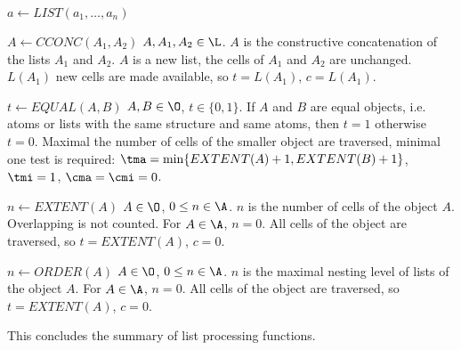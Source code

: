 \begin{deflist}{$a \gets LIST(a_1, \ldots, a_n)$}
\item[$A \gets CCONC(A_1, A_2)$] $A, A_1, A_2 \in \L$. 
     $A$ is the constructive concatenation of the 
     lists $A_1$ and $A_2$. $A$ is a new list,
     the cells of $A_1$ and $A_2$ are unchanged. 
     $L(A_1)$ new cells are made available, so 
     $t = L(A_1)$, $c = L(A_1)$.
\item[$t \gets EQUAL(A,B)$] $A, B \in \O$, $t \in \{0, 1\}$. 
     If $A$ and $B$ are equal objects, i.e. 
     atoms or lists with the same structure and same atoms, 
     then $t = 1$ otherwise $t = 0$.
     Maximal the number of cells of the smaller
     object are traversed, minimal one test is required: 
     $\tma = \min\{ EXTENT(A) + 1, EXTENT(B) + 1 \}$, 
     $\tmi = 1$, $\cma = \cmi = 0$.
\item[$n \gets EXTENT(A)$] $A \in \O$, $0 \leq n \in \A$. 
     $n$ is the number of cells of the object $A$.
     Overlapping is not counted.
     For $A \in \A$, $n = 0$.
     All cells of the object are traversed, so  
     $t = EXTENT (A)$, $c = 0$.
\item[$n \gets ORDER(A)$] $A \in \O$, $0 \leq n \in \A$. 
     $n$ is the maximal nesting level of lists of the object $A$.
     For $A \in \A$, $n = 0$.
     All cells of the object are traversed, so  
     $t = EXTENT (A)$, $c = 0$.
\end{deflist}

This concludes the summary of list processing functions.
